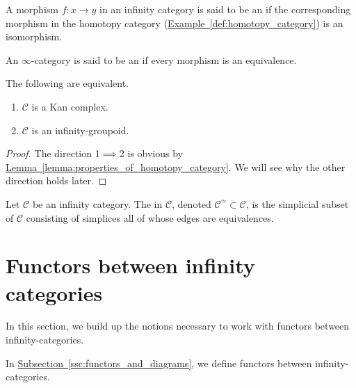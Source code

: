 \documentclass[main.tex]{subfiles}
\begin{document}
\begin{definition}[equivalence]
  \label{def:equivalence}
  A morphism $f\colon x \to y$ in an infinity category is said to be an  if the corresponding morphism in the homotopy category (\hyperref[def:homotopy_category]{Example~\ref*{def:homotopy_category}}) is an isomorphism.
\end{definition}

\begin{definition}
  \label{def:infinity_groupoid}
  An $\infty$-category is said to be an  if every morphism is an equivalence.
\end{definition}

\begin{theorem}
  \label{thm:infinity_groupoid_iff_kan_complex}
  The following are equivalent.
  \begin{enumerate}
    \item $\mathcal{C}$ is a Kan complex.

    \item $\mathcal{C}$ is an infinity-groupoid.
  \end{enumerate}
\end{theorem}
\begin{proof}
  The direction 1$\implies$2 is obvious by \hyperref[lemma:properties_of_homotopy_category]{Lemma~\ref*{lemma:properties_of_homotopy_category}}. We will see why the other direction holds later.
\end{proof}

\begin{definition}
  \label{def:maximal_infinity_groupoid}
  Let $\mathcal{C}$ be an infinity category. The  in $\mathcal{C}$, denoted $\mathcal{C}^{\simeq} \subset \mathcal{C}$, is the simplicial subset of $\mathcal{C}$ consisting of simplices all of whose edges are equivalences.
\end{definition}

\section{Functors between infinity categories}
\label{sec:functors_between_infinity_categories}

In this section, we build up the notions necessary to work with functors between infinity-categories.

In \hyperref[ssc:functors_and_diagrams]{Subsection~\ref*{ssc:functors_and_diagrams}}, we define functors between infinity-categories.
\end{document}
